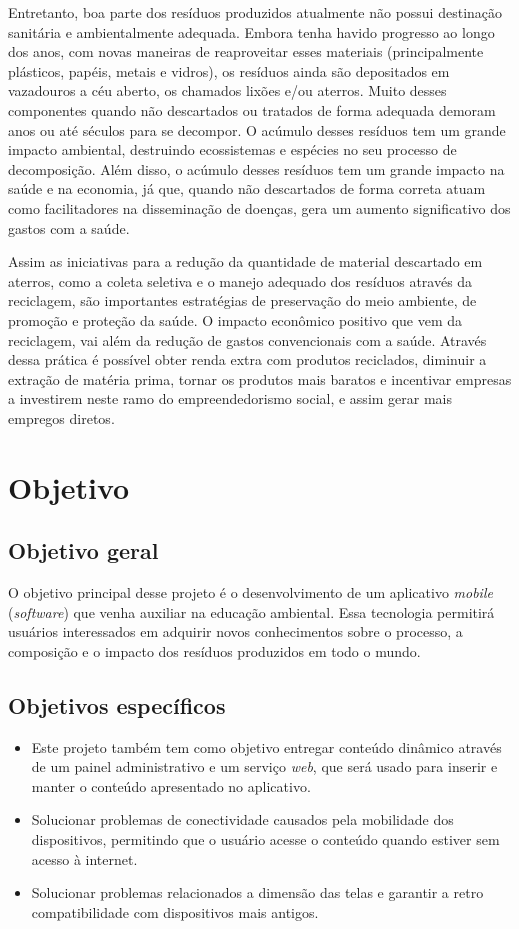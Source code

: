 \documentclass[
	12pt,				%
	openany,			%
	twoside,			%
	a4paper,			%
	english,			%
	french,				%
	spanish,			%
	brazil				%
	]{abntex2}
\begin{document}
Entretanto, boa parte dos resíduos produzidos atualmente não possui destinação sanitária e ambientalmente adequada. Embora tenha havido progresso ao longo dos anos, com novas  maneiras de reaproveitar esses materiais (principalmente plásticos, papéis, metais e vidros),  os resíduos ainda são depositados em vazadouros a céu aberto, os chamados lixões e/ou aterros. Muito desses componentes quando não descartados ou tratados de forma adequada demoram anos ou até séculos para se decompor. O acúmulo desses resíduos tem um grande impacto ambiental, destruindo ecossistemas e espécies no seu processo de decomposição. Além disso, o acúmulo desses resíduos tem um grande impacto na saúde e na economia, já que, quando não descartados de forma correta atuam como facilitadores na disseminação de doenças, gera um aumento significativo dos gastos com a saúde.

Assim as iniciativas para a redução da quantidade de material descartado em aterros, como a coleta seletiva e o manejo adequado dos resíduos através da reciclagem,  são importantes estratégias de preservação do meio ambiente, de promoção e proteção da saúde.
 O impacto econômico positivo que vem da reciclagem, vai além da redução de gastos convencionais com a saúde. Através dessa prática é possível obter renda extra com produtos reciclados, diminuir a extração de matéria prima, tornar os produtos mais baratos  e incentivar empresas a investirem neste ramo do empreendedorismo social, e assim gerar mais empregos diretos.
\section{Objetivo}
\subsection{Objetivo geral}
O objetivo principal desse projeto é o desenvolvimento de um aplicativo \textit{mobile} (\textit{software}) que venha auxiliar na educação ambiental. Essa tecnologia permitirá usuários interessados em adquirir novos conhecimentos sobre o processo, a composição e o impacto dos resíduos produzidos em todo o mundo.

\subsection{Objetivos específicos}
\begin{itemize}
	\item Este projeto também tem como objetivo entregar conteúdo dinâmico através de um painel administrativo e um serviço \textit{web}, que será usado para inserir e manter o conteúdo apresentado no aplicativo.
    \item Solucionar problemas de conectividade causados pela mobilidade dos dispositivos, permitindo que o usuário acesse o conteúdo quando estiver sem acesso à internet.
        \item Solucionar problemas relacionados a dimensão das telas e garantir a retro compatibilidade com dispositivos mais antigos.
\end{itemize}
\end{document}
